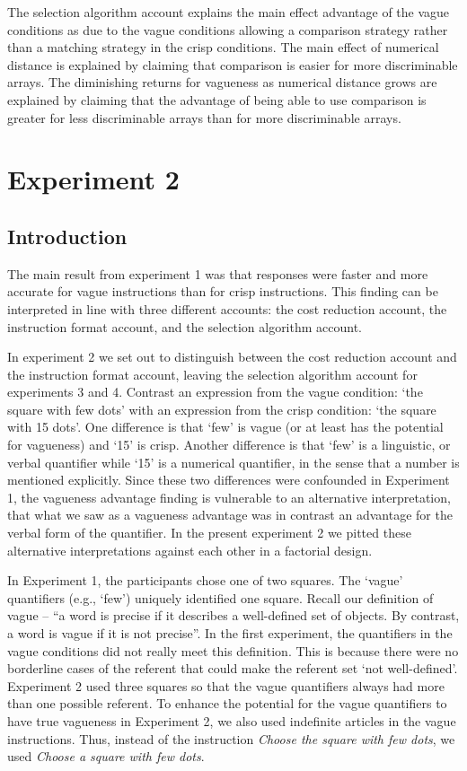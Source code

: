 \documentclass[
a4paper 
, doc
, longtable
]{apa6}
\begin{document}
The selection algorithm account explains the main effect advantage of the vague conditions as due to the vague conditions allowing a comparison strategy rather than a matching strategy in the crisp conditions. The main effect of numerical distance is explained by claiming that comparison is easier for more discriminable arrays. The diminishing returns for vagueness as numerical distance grows are explained by claiming that the advantage of being able to use comparison is greater for less discriminable arrays than for more discriminable arrays.

\section{Experiment 2}

\subsection{Introduction}

The main result from experiment 1 was that responses were faster and more accurate for vague instructions than for crisp instructions. This finding can be interpreted in line with three different accounts: the cost reduction account, the instruction format account, and the selection algorithm account. 

In experiment 2 we set out to distinguish between the cost reduction account and the instruction format account, leaving the selection algorithm account for experiments 3 and 4. Contrast an expression from the vague condition: `the square with few dots' with an expression from the crisp condition: `the square with 15 dots'. One difference is that `few' is vague (or at least has the potential for vagueness) and `15' is crisp. Another difference is that `few' is a linguistic, or verbal quantifier while `15' is a numerical quantifier, in the sense that a number is mentioned explicitly. Since these two differences were confounded in Experiment 1, the vagueness advantage finding is vulnerable to an alternative interpretation, that what we saw as a vagueness advantage was in contrast an advantage for the verbal form of the quantifier. In the present experiment 2 we pitted these alternative interpretations against each other in a factorial design. 

In Experiment 1, the participants chose one of two squares. The `vague' quantifiers (e.g., `few') uniquely identified one square. Recall our definition of vague  -- ``a word is precise if it describes a well-defined set of objects. By contrast, a word is vague if it is not precise''.  In the first experiment, the quantifiers in the vague conditions did not really meet this definition. This is because there were no borderline cases of the referent that could make the referent set `not well-defined'. Experiment 2 used three squares so that the vague quantifiers always had more than one possible referent. To enhance the potential for the vague quantifiers to have true vagueness in Experiment 2, we also used indefinite articles in the vague instructions. Thus, instead of the instruction \emph{Choose the square with few dots}, we used \emph{Choose a square with few dots}.
\end{document}
